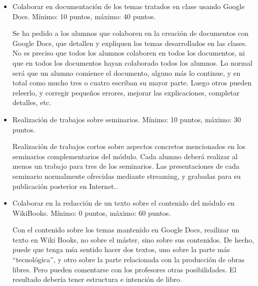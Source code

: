 \documentclass[a4paper,12pt]{article}
\begin{document}
\begin{itemize}
\item Colaborar en documentación de los temas tratados en clase usando Google Docs. Mínimo: 10 puntos, máximo: 40 puntos.

Se ha pedido a los alumnos que colaboren en la creación de documentos con Google Docs, que detallen y expliquen los temas desarrollados en las clases. No es preciso que todos los alumnos colaboren en todos los documentos, ni que en todos los documentos hayan colaborado todos los alumnos. Lo normal será que un alumno comience el documento, alguno más lo continue, y en total como mucho tres o cuatro escriban su mayor parte. Luego otros pueden releerlo, y corregir pequeños errores, mejorar las explicaciones, completar detalles, etc.

\item Realización de trabajos sobre seminarios. Mínimo: 10 puntos, máximo: 30 puntos.

Realización de trabajos cortos sobre aspectos concretos mencionados en los seminarios complementarios del módulo. Cada alumno deberá realizar al menos un trabajo para tres de los seminarios. Las presentaciones de cada seminario normalmente ofrecidas mediante streaming, y grabadas para su publicación posterior en Internet..

\item Colaborar en la redacción de un texto sobre el contenido del módulo en WikiBooks. Mínimo: 0 puntos, máximo: 60 puntos.

Con el contenido sobre los temas mantenido en Google Docs, reailizar un texto en Wiki Books, no sobre el máster, sino sobre sus contenidos. De hecho, puede que tenga mśa sentido hacer dos textos, uno sobre la parte más ``tecnológica'', y otro sobre la parte relacionada con la producción de obras libres. Pero pueden comentarse con los profesores otras posibilidades. El resultado debería tener estructura e intención de libro.

\end{itemize}


\end{document}
